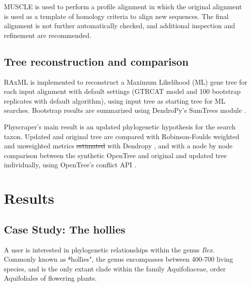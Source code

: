 \documentclass{bmcart}
\providecommand{\DIFaddtex}[1]{{\protect\color{blue}\uwave{#1}}} %
\providecommand{\DIFdeltex}[1]{{\protect\color{red}\sout{#1}}}                      %
\providecommand{\DIFaddbegin}{} %
\providecommand{\DIFaddend}{} %
\providecommand{\DIFdelbegin}{} %
\providecommand{\DIFdelend}{} %
\providecommand{\DIFadd}[1]{\texorpdfstring{\DIFaddtex{#1}}{#1}} %
\providecommand{\DIFdel}[1]{\texorpdfstring{\DIFdeltex{#1}}{}} %
\begin{document}
MUSCLE \cite{edgar2004muscle} is used to perform a profile alignment in which the
original alignment is used as a template of homology criteria to align new sequences.
The final alignment is not further automatically checked, and additional inspection
and refinement are recommended.

\subsection*{Tree reconstruction and comparison}

RAxML \cite{stamatakis2014raxml} is implemented to reconstruct a Maximum Likelihood
(ML) gene tree for each input alignment with default settings (GTRCAT model and
100 bootstrap replicates with default algorithm), using input tree as starting
tree for ML searches.
Bootstrap results are summarized using DendroPy's SumTrees module
\cite{sukumaran2010dendropy}.

Physcraper's main result is an updated phylogenetic hypothesis for the search taxon.
Updated and original tree are compared with Robinson-Foulds weighted and unweighted
metrics \DIFdelbegin \DIFdel{estimated }\DIFdelend \DIFaddbegin \DIFadd{calculated }\DIFaddend with Dendropy \cite{sukumaran2010dendropy}, and with a node by node
comparison between the synthetic OpenTree and original and updated tree individually,
using OpenTree's conflict API \cite{redelings2017supertree}.


\section*{Results}
\subsection*{Case Study: The hollies}

A user is interested in phylogenetic relationships within the genus \textit{Ilex}. Commonly
known as \DIFdelbegin \DIFdel{"}\DIFdelend \DIFaddbegin \DIFadd{``}\DIFaddend hollies", the genus encompasses between 400-700 living species, and is
the only extant clade within the family Aquifoliaceae, order Aquifoliales of flowering
plants.
\end{document}
